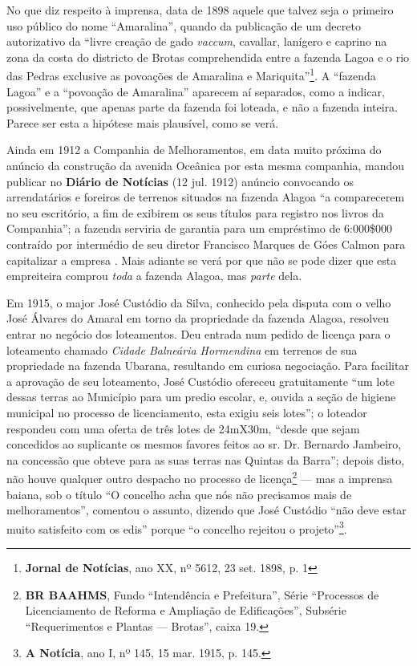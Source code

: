 No que diz respeito à imprensa, data de 1898 aquele que talvez seja o primeiro uso público do nome ``Amaralina'', quando da publicação de um decreto autorizativo da ``livre creação de gado \textit{vaccum}, cavallar,  lanígero e caprino na zona da costa do districto de Brotas comprehendida entre a fazenda Lagoa e o rio das Pedras exclusive as povoações de Amaralina e Mariquita''\footnote{\textbf{Jornal de Notícias}, ano XX, nº 5612, 23 set. 1898, p. 1}. A ``fazenda Lagoa'' e a ``povoação de Amaralina'' aparecem aí separados, como a indicar, possivelmente, que apenas parte da fazenda foi loteada, e não a fazenda inteira. Parece ser esta a hipótese mais plausível, como se verá. 

Ainda em 1912 a Companhia de Melhoramentos, em data muito próxima do anúncio da construção da avenida Oceânica por esta mesma companhia, mandou publicar no \textbf{Diário de Notícias} (12 jul. 1912) anúncio convocando os arrendatários e foreiros de terrenos situados na fazenda Alagoa ``a comparecerem no seu escritório, a fim de exibirem os seus títulos para registro nos livros da Companhia''; a fazenda serviria de garantia para um empréstimo de 6:000\$000 contraído por intermédio de seu diretor Francisco Marques de Góes Calmon para capitalizar a empresa \cite[p.~123]{CUNHA2011}. Mais adiante se verá por que não se pode dizer que esta empreiteira comprou \textit{toda} a fazenda Alagoa, mas \textit{parte} dela.

Em 1915, o major José Custódio da Silva, conhecido pela disputa com o velho José Álvares do Amaral em torno da propriedade da fazenda Alagoa, resolveu entrar no negócio dos loteamentos.  Deu entrada num pedido de licença para o loteamento chamado \textit{Cidade Balneária Hormendina} em terrenos de sua propriedade na fazenda Ubarana, resultando em curiosa negociação. Para facilitar a aprovação de seu loteamento, José Custódio ofereceu gratuitamente ``um lote dessas terras ao Município para um predio escolar, e, ouvida a seção de higiene municipal no processo de licenciamento, esta exigiu seis lotes''; o loteador respondeu com uma oferta de três lotes de 24mX30m, ``desde que sejam concedidos ao suplicante os mesmos favores feitos ao sr. Dr. Bernardo Jambeiro, na concessão que obteve para as suas terras nas Quintas da Barra''; depois disto, não houve qualquer outro despacho no processo de licença\footnote{\textbf{BR BAAHMS}, Fundo ``Intendência e Prefeitura'', Série ``Processos de Licenciamento de Reforma e Ampliação de Edificações'', Subsérie ``Requerimentos e Plantas --- Brotas'', caixa 19.} --- mas a imprensa baiana, sob o título ``O concelho acha que nós não precisamos mais de melhoramentos'', comentou o assunto, dizendo que José Custódio ``não deve estar muito satisfeito com os edis'' porque ``o concelho rejeitou o projeto''\footnote{\textbf{A Notícia}, ano I, nº 145, 15 mar. 1915, p. 145.}.

